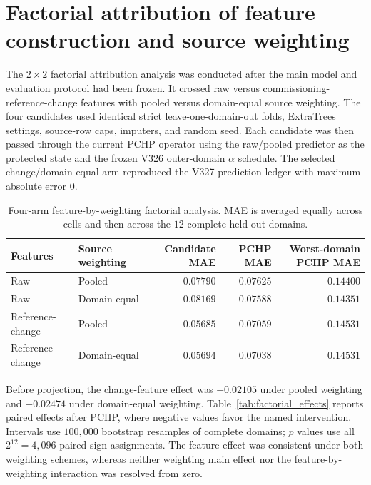 \documentclass[11pt]{article}
\begin{document}
\section{Factorial attribution of feature construction and source weighting}

The $2\times2$ factorial attribution analysis was conducted after the main model and evaluation protocol had been frozen. It crossed raw versus commissioning-reference-change features with pooled versus domain-equal source weighting. The four candidates used identical strict leave-one-domain-out folds, ExtraTrees settings, source-row caps, imputers, and random seed. Each candidate was then passed through the current PCHP operator using the raw/pooled predictor as the protected state and the frozen V326 outer-domain $\alpha$ schedule. The selected change/domain-equal arm reproduced the V327 prediction ledger with maximum absolute error $0$.

\begin{table}[H]
\centering
\caption{Four-arm feature-by-weighting factorial analysis. MAE is averaged equally across cells and then across the $12$ complete held-out domains.}
\label{tab:factorial_arms}
\begin{tabularx}{\textwidth}{>{\raggedright\arraybackslash}X>{\raggedright\arraybackslash}Xrrr}
\toprule
Features & Source weighting & Candidate MAE & PCHP MAE & Worst-domain PCHP MAE \\
\midrule
Raw & Pooled & $0.07790$ & $0.07625$ & $0.14400$ \\
Raw & Domain-equal & $0.08169$ & $0.07588$ & $0.14351$ \\
Reference-change & Pooled & $0.05685$ & $0.07059$ & $0.14531$ \\
Reference-change & Domain-equal & $0.05694$ & $0.07038$ & $0.14531$ \\
\bottomrule
\end{tabularx}
\end{table}

Before projection, the change-feature effect was $-0.02105$ under pooled weighting and $-0.02474$ under domain-equal weighting. Table~\ref{tab:factorial_effects} reports paired effects after PCHP, where negative values favor the named intervention. Intervals use $100{,}000$ bootstrap resamples of complete domains; $p$ values use all $2^{12}=4{,}096$ paired sign assignments. The feature effect was consistent under both weighting schemes, whereas neither weighting main effect nor the feature-by-weighting interaction was resolved from zero.
\end{document}
